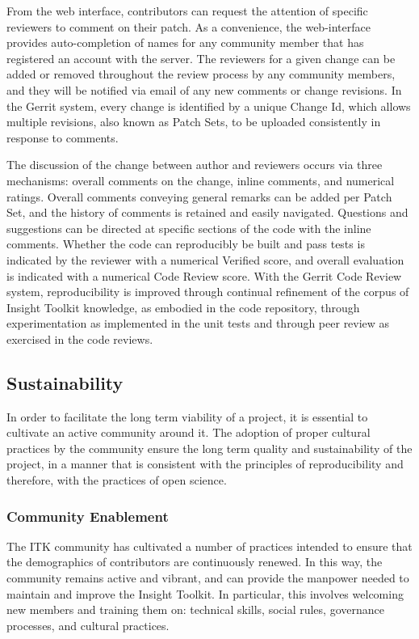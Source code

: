 \documentclass{frontiersENG} %
\begin{document}
From the web interface, contributors can request the attention of specific
reviewers to comment on their patch. As a convenience, the web-interface
provides auto-completion of names for any community member that has registered
an account with the server.  The reviewers for a given change can be added or
removed throughout the review process by any community members, and they will
be notified via email of any new comments or change revisions.  In the Gerrit
system, every change is identified by a unique Change Id, which allows multiple
revisions, also known as Patch Sets, to be uploaded consistently in response to
comments.

The discussion of the change between author and reviewers occurs via three
mechanisms: overall comments on the change, inline comments, and numerical
ratings. Overall comments conveying general remarks can be added per Patch
Set, and the history of comments is retained and easily navigated. Questions
and suggestions can be directed at specific sections of the code with the
inline comments. Whether the code can reproducibly be built and pass tests is
indicated by the reviewer with a numerical Verified score, and overall
evaluation is indicated with a numerical Code Review score. With the Gerrit
Code Review system, reproducibility is improved through continual refinement of
the corpus of Insight Toolkit knowledge, as embodied in the code repository,
through experimentation as implemented in the unit tests and through peer
review as exercised in the code reviews.



\subsection{Sustainability}

In order to facilitate the long term viability of a project, it is essential to
cultivate an active community around it. The adoption of proper cultural
practices by the community ensure the long term quality and sustainability of
the project, in a manner that is consistent with the principles of
reproducibility and therefore, with the practices of open science.

\subsubsection{Community Enablement}

The ITK community has cultivated a number of practices intended to ensure that
the demographics of contributors are continuously renewed. In this way, the
community remains active and vibrant, and can provide the manpower needed to
maintain and improve the Insight Toolkit. In particular, this involves welcoming
new members and training them on:  technical skills, social rules, governance
processes, and cultural practices.
\end{document}

